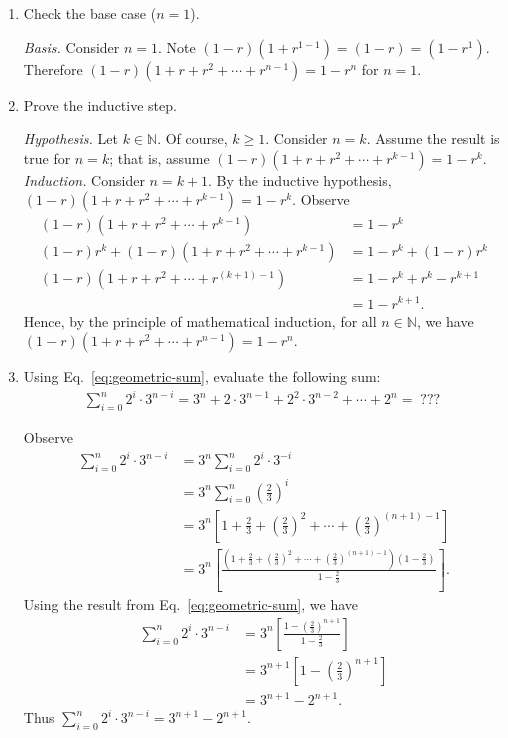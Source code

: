 \begin{enumerate}
    \item Check the base case ($n=1$).
\begin{solution}
\textit{Basis. }Consider $n=1$. Note $(1-r)(1+r^{1-1})=(1-r)=(1-r^1)$. Therefore $(1-r)(1+r+r^2+\cdots+r^{n-1})=1-r^n$ for $n=1$.
\end{solution}   
    \item Prove the inductive step.
\begin{solution}
\textit{Hypothesis. }Let $k\in\mathbb{N}$. Of course, $k\geq 1$. Consider $n=k$. Assume the result is true for $n=k$; that is, assume $(1-r)(1+r+r^2+\cdots+r^{k-1})=1-r^k$.\\

\textit{Induction. }Consider $n=k+1$. By the inductive hypothesis, $(1-r)(1+r+r^2+\cdots+r^{k-1})=1-r^k$. Observe
\begin{align*}
(1-r)(1+r+r^2+\cdots+r^{k-1})&=1-r^k\\
(1-r)r^k+(1-r)(1+r+r^2+\cdots+r^{k-1})&=1-r^k+(1-r)r^k\\
(1-r)(1+r+r^2+\cdots+r^{(k+1)-1})&=1-r^k+r^k-r^{k+1}\\
&=1-r^{k+1}.
\end{align*}
Hence, by the principle of mathematical induction, for all $n\in\mathbb{N}$, we have $(1-r)(1+r+r^2+\cdots+r^{n-1})=1-r^n$.~\square
\end{solution}
    
    \item Using Eq.~\eqref{eq:geometric-sum}, evaluate the following sum:
    \begin{align*}
        \sum_{i = 0}^n 2^i \cdot 3^{n-i}
        =
        3^n + 2\cdot 3^{n-1} + 2^2 \cdot 3^{n-2} + \cdots + 2^n =\; ???\;
    \end{align*}
    
\begin{solution}
Observe
\begin{align*}
\sum_{i=0}^{n}{2^i\cdot3^{n-i}}&=3^n\sum_{i=0}^{n}{2^i\cdot3^{-i}}\\
&=3^n\sum_{i=0}^n{\left(\frac{2}{3}\right)^i}\\
&=3^n\left[1+\frac{2}{3}+\left(\frac{2}{3}\right)^2+\cdots+\left(\frac{2}{3}\right)^{(n+1)-1}\right]\\
&=3^n\left[\frac{\left(1+\frac{2}{3}+\left(\frac{2}{3}\right)^2+\cdots+\left(\frac{2}{3}\right)^{(n+1)-1}\right)\left(1-\frac{2}{3}\right)}{1-\frac{2}{3}}\right].
\end{align*}
Using the result from Eq.~\eqref{eq:geometric-sum}, we have
\begin{align*}
\sum_{i=0}^{n}{2^i\cdot3^{n-i}}&=3^n\left[\frac{1-\left(\frac{2}{3}\right)^{n+1}}{1-\frac{2}{3}}\right]\\
&=3^{n+1}\left[1-\left(\frac{2}{3}\right)^{n+1}\right]\\
&=3^{n+1}-2^{n+1}.
\end{align*}
Thus $\sum_{i=0}^{n}{2^i\cdot3^{n-i}}=3^{n+1}-2^{n+1}$.~\square
\end{solution}
\end{enumerate}




